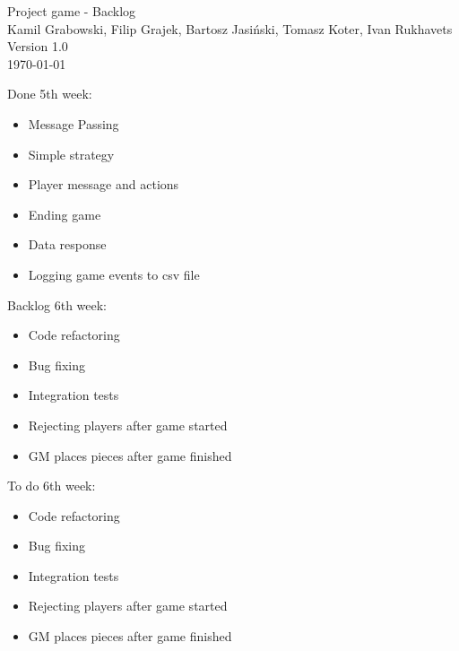 \documentclass[11pt,a4paper]{article}
\begin{document}
\begin{titlepage}
\centering
\huge Project game - Backlog \\
\vspace{1.5cm}
\large Kamil Grabowski, Filip Grajek, Bartosz Jasiński, Tomasz Koter, Ivan Rukhavets \\
\vspace{1.0cm}
Version 1.0 \\
\vspace{1.0cm}
\today
\end{titlepage}

Done 5th week:
\begin{itemize}
\item Message Passing
\item Simple strategy
\item Player message and actions
\item Ending game
\item Data response
\item Logging game events to csv file
\end{itemize}


Backlog 6th week:
\begin{itemize}
\item Code refactoring
\item Bug fixing
\item Integration tests
\item Rejecting players after game started
\item GM places pieces after game finished
\end{itemize}


To do 6th week:
\begin{itemize}
 \item Code refactoring
\item Bug fixing
\item Integration tests
\item Rejecting players after game started
\item GM places pieces after game finished
\end{itemize}
\end{document}
